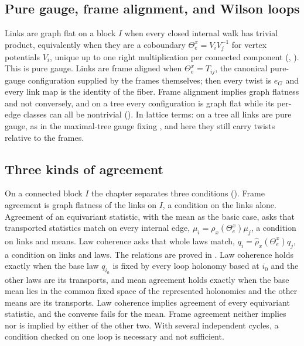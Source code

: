 \subsection{Pure gauge, frame alignment, and Wilson loops}

Links are graph flat on a block $I$ when every closed internal walk has trivial product, equivalently when they
are a coboundary $\Theta_e^x=V_iV_j^{-1}$ for vertex potentials $V_i$, unique up to one right multiplication per
connected component (, ). This is pure gauge.
Links are frame aligned when $\Theta_e^x=T_{ij}$, the canonical pure-gauge configuration supplied by the frames
themselves; then every twist is $e_G$ and every link map is the identity of the fiber. Frame alignment implies
graph flatness and not conversely, and on a tree every configuration is graph flat while its per-edge classes can
all be nontrivial (). In lattice terms: on a tree all links are pure gauge, as in
the maximal-tree gauge fixing \citep{Creutz1977}, and here they still carry twists relative to the frames.

\subsection{Three kinds of agreement}

On a connected block $I$ the chapter separates three conditions (). Frame
agreement is graph flatness of the links on $I$, a condition on the links alone. Agreement of an equivariant
statistic, with the mean as the basic case, asks that transported statistics match on every internal edge,
$\mu_i=\rho_x(\Theta_e^x)\mu_j$, a condition on links and means. Law coherence asks that whole laws match,
$q_i=\widehat\rho_x(\Theta_e^x)q_j$, a condition on links and laws. The relations are proved in
. Law coherence holds exactly when the base law $q_{i_0}$ is fixed by every
loop holonomy based at $i_0$ and the other laws are its transports, and mean agreement holds exactly when
the base mean lies in the common fixed space of the represented holonomies and the other means are its
transports. Law coherence implies agreement
of every equivariant statistic, and the converse fails for the mean. Frame agreement neither implies nor is
implied by either of the other two. With several independent cycles, a condition checked on one loop is
necessary and not sufficient.

